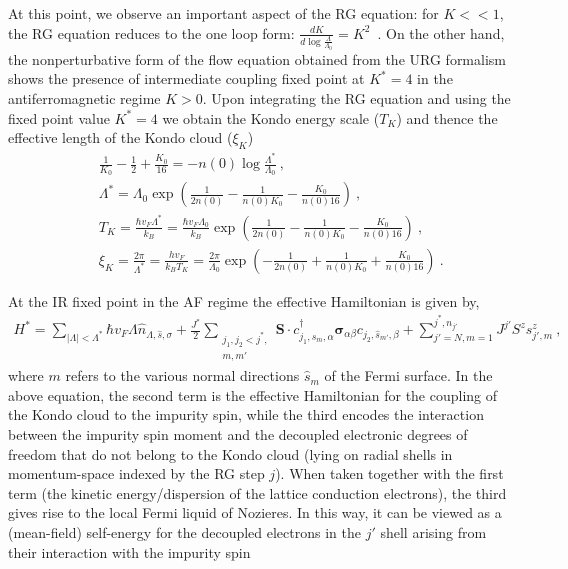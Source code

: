 \documentclass[aps,prb,preprint,groupedaddress]{revtex4-2}
\begin{document}
At this point, we observe an important aspect of the RG equation: for $K<<1$, the RG equation reduces to the one loop form: $\frac{d K}{d\log\frac{\Lambda}{\Lambda_{0}}}=K^{2}$~\cite{anderson1970poor}. On the other hand, the nonperturbative form of the flow equation obtained from the URG formalism shows the presence of intermediate coupling fixed point at $K^{*}=4$ in the antiferromagnetic regime $K>0$. Upon integrating the RG equation and using the fixed point value $K^{*}=4$ we obtain the Kondo energy scale ($T_{K}$) and thence the effective length of the Kondo cloud ($\xi_{K}$)
\begin{eqnarray}
&&\frac{1}{K_{0}}-\frac{1}{2}+\frac{K_{0}}{16}=-n(0)\log\frac{\Lambda^{*}}{\Lambda_{0}}~,\\
&&\Lambda^{*}=\Lambda_{0}\exp\left(\frac{1}{2n(0)}-\frac{1}{n(0)K_{0}}-\frac{K_{0}}{n(0)16}\right)~,\label{gap function}\\
&&T_{K} = \frac{\hbar v_{F}\Lambda^{*}}{k_{B}}= \frac{\hbar v_{F}\Lambda_{0}}{k_{B}}\exp\left(\frac{1}{2n(0)}-\frac{1}{n(0)K_{0}}-\frac{K_{0}}{n(0)16}\right)~,\label{KondoTemp}\\
&&\xi_{K} = \frac{2\pi}{\Lambda^{*}} = \frac{h v_{F}}{k_{B}T_{K}} = \frac{2\pi}{\Lambda_{0}}\exp\left(-\frac{1}{2n(0)}+\frac{1}{n(0)K_{0}}+\frac{K_{0}}{n(0)16}\right)~.\label{KSlength}
\end{eqnarray}
\par\noindent
At the IR fixed point in the AF regime the effective Hamiltonian is given by,
\begin{eqnarray}
H^{*}=\sum_{|\Lambda|<\Lambda^{*}}\hbar v_{F}\Lambda\hat{n}_{\Lambda,\hat{s},\sigma}+\frac{J^{*}}{2}\sum_{\substack{j_{1},j_{2}<j^{*},\\ m,m'}}\mathbf{S}\cdot c^{\dagger}_{j_{1},\hat{s}_{m},\alpha}\boldsymbol{\sigma}_{\alpha\beta}c_{j_{2},\hat{s}_{m'},\beta}+\sum_{j'=N,m=1}^{j^{*},n_{j'}}J^{j'}S^{z}s^{z}_{j',m}~,\label{fixedPointHam}
\end{eqnarray} 
where $m$ refers to the various normal directions $\hat{s}_{m}$ of the Fermi surface. In the above equation, the second term is the effective Hamiltonian for the coupling of the Kondo cloud to the impurity spin, while the third encodes the interaction between the impurity spin moment and the decoupled electronic degrees of freedom that do not belong to the Kondo cloud (lying on radial shells in momentum-space indexed by the RG step $j$). When taken together with the first term (the kinetic energy/dispersion of the lattice conduction electrons), the third gives rise to the local Fermi liquid of Nozieres. In this way, it can be viewed as a (mean-field) self-energy for the decoupled electrons in the $j'$ shell arising from their interaction with the impurity spin
\end{document}
